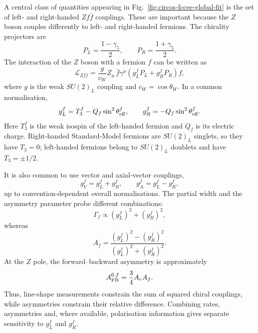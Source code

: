 \documentclass[11pt,a4paper]{report}
\begin{document}
A central class of quantities appearing in
Fig.~\ref{fig:circos-fccee-global-fit} is the set of left- and right-handed
\(Zf\bar f\) couplings.  These are important because the \(Z\) boson couples
differently to left- and right-handed fermions.  The chirality projectors are
\begin{equation}
P_L = \frac{1-\gamma_5}{2},
\qquad
P_R = \frac{1+\gamma_5}{2}.
\label{eq:chirality-projectors-global}
\end{equation}
The interaction of the \(Z\) boson with a fermion \(f\) can be written as
\begin{equation}
\mathcal L_{Zff}
=
\frac{g}{c_W}
Z_\mu\,
\bar f\gamma^\mu
\left(
g_L^f P_L + g_R^f P_R
\right) f ,
\label{eq:zff-left-right-couplings-global}
\end{equation}
where \(g\) is the weak \(SU(2)_L\) coupling and
\(c_W=\cos\theta_W\).  In a common normalisation,
\begin{equation}
g_L^f
=
T_3^f - Q_f\sin^2\theta_{\rm eff}^f,
\qquad
g_R^f
=
-Q_f\sin^2\theta_{\rm eff}^f .
\label{eq:gL-gR-definitions-global}
\end{equation}
Here \(T_3^f\) is the weak isospin of the left-handed fermion and \(Q_f\) is
its electric charge.  Right-handed Standard-Model fermions are \(SU(2)_L\)
singlets, so they have \(T_3=0\); left-handed fermions belong to \(SU(2)_L\)
doublets and have \(T_3=\pm 1/2\).

It is also common to use vector and axial-vector couplings,
\begin{equation}
	g_V^f = g_L^f + g_R^f,
	\qquad
	g_A^f = g_L^f - g_R^f,
	\label{eq:gV-gA-from-gL-gR}
\end{equation}
up to convention-dependent overall normalisations.  The partial width and the
asymmetry parameter probe different combinations:
\begin{equation}
	\Gamma_f
	\propto
	(g_L^f)^2+(g_R^f)^2,
	\label{eq:gamma-f-gL-gR}
\end{equation}
whereas
\begin{equation}
	A_f
	=
	\frac{(g_L^f)^2-(g_R^f)^2}
	{(g_L^f)^2+(g_R^f)^2}.
	\label{eq:Af-gL-gR}
\end{equation}
At the \(Z\) pole, the forward--backward asymmetry is approximately
\begin{equation}
	A_{\rm FB}^{0,f}
	=
	\frac{3}{4}A_e A_f .
	\label{eq:AFB-Ae-Af-global}
\end{equation}
Thus, line-shape measurements constrain the sum of squared chiral couplings,
while asymmetries constrain their relative difference.  Combining rates,
asymmetries and, where available, polarisation information gives separate
sensitivity to \(g_L^f\) and \(g_R^f\).
\end{document}
